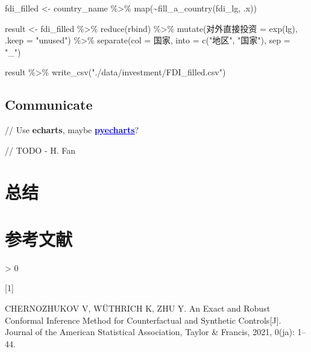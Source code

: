 \documentclass[
]{ctexart}
\newenvironment{Shaded}{\begin{snugshade}}{\end{snugshade}}
\newcommand{\AttributeTok}[1]{\textcolor[rgb]{0.77,0.63,0.00}{#1}}
\newcommand{\FunctionTok}[1]{\textcolor[rgb]{0.00,0.00,0.00}{#1}}
\newcommand{\NormalTok}[1]{#1}
\newcommand{\OtherTok}[1]{\textcolor[rgb]{0.56,0.35,0.01}{#1}}
\newcommand{\SpecialCharTok}[1]{\textcolor[rgb]{0.00,0.00,0.00}{#1}}
\newcommand{\StringTok}[1]{\textcolor[rgb]{0.31,0.60,0.02}{#1}}
\let\oldhref\href
\renewcommand{\href}[2]{\oldhref{#1}{\textcolor{blue}{\underline{#2}}}}
\newlength{\cslhangindent}
\newlength{\csllabelwidth}
\newenvironment{CSLReferences}[2] %
 {%
  \setlength{\parindent}{0pt}
  \ifodd #1 \everypar{\setlength{\hangindent}{\cslhangindent}}\ignorespaces\fi
  \ifnum #2 > 0
  \setlength{\parskip}{#2\baselineskip}
  \fi
 }%
 {}
\newcommand{\CSLLeftMargin}[1]{\parbox[t]{\csllabelwidth}{#1}}
\newcommand{\CSLRightInline}[1]{\parbox[t]{\linewidth - \csllabelwidth}{#1}\break}
\begin{document}
\begin{Shaded}
\begin{Highlighting}[]
\NormalTok{fdi\_filled }\OtherTok{\textless{}{-}}\NormalTok{ country\_name }\SpecialCharTok{\%\textgreater{}\%} \FunctionTok{map}\NormalTok{(}\SpecialCharTok{\textasciitilde{}}\FunctionTok{fill\_a\_country}\NormalTok{(fdi\_lg, .x))}

\NormalTok{result }\OtherTok{\textless{}{-}}\NormalTok{ fdi\_filled }\SpecialCharTok{\%\textgreater{}\%}
  \FunctionTok{reduce}\NormalTok{(rbind) }\SpecialCharTok{\%\textgreater{}\%}
  \FunctionTok{mutate}\NormalTok{(对外直接投资 }\OtherTok{=} \FunctionTok{exp}\NormalTok{(lg), }\AttributeTok{.keep =} \StringTok{"unused"}\NormalTok{) }\SpecialCharTok{\%\textgreater{}\%}
  \FunctionTok{separate}\NormalTok{(}\AttributeTok{col =}\NormalTok{ 国家, }\AttributeTok{into =} \FunctionTok{c}\NormalTok{(}\StringTok{"地区"}\NormalTok{, }\StringTok{"国家"}\NormalTok{), }\AttributeTok{sep =} \StringTok{"\_"}\NormalTok{)}

\NormalTok{result }\SpecialCharTok{\%\textgreater{}\%} \FunctionTok{write\_csv}\NormalTok{(}\StringTok{"./data/investment/FDI\_filled.csv"}\NormalTok{)}
\end{Highlighting}
\end{Shaded}

\hypertarget{communicate}{%
\subsection{Communicate}\label{communicate}}

// Use \textbf{echarts}, maybe
\href{https://github.com/pyecharts}{\textbf{pyecharts}}?

// TODO - H. Fan

\hypertarget{ux603bux7ed3}{%
\section{总结}\label{ux603bux7ed3}}

\hypertarget{ux53c2ux8003ux6587ux732e}{%
\section*{参考文献}\label{ux53c2ux8003ux6587ux732e}}

\hypertarget{refs}{}
\begin{CSLReferences}{0}{0}
\leavevmode\hypertarget{ref-doi:10.1080ux2f01621459.2021.1920957}{}%
\CSLLeftMargin{{[}1{]} }
\CSLRightInline{CHERNOZHUKOV V, WÜTHRICH K, ZHU Y. An Exact and Robust
Conformal Inference Method for Counterfactual and Synthetic
Controls{[}J{]}. Journal of the American Statistical Association, Taylor
\& Francis, 2021, 0(ja): 1--44.}

\end{CSLReferences}
\end{document}
